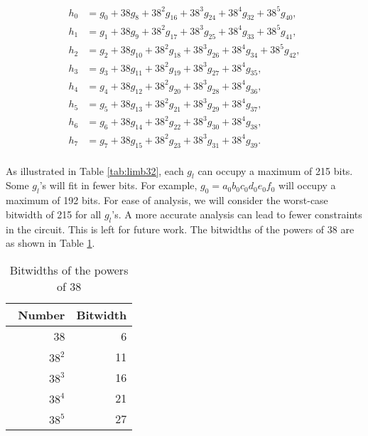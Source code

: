 \documentclass[a4paper, 12pt]{article}
\begin{document}
\begin{align*}
  h_0 & = g_0 + 38 g_8 + 38^2 g_{16} + 38^3 g_{24} + 38^4 g_{32} + 38^5 g_{40},\\
  h_1 & = g_1 + 38 g_9 + 38^2 g_{17} + 38^3 g_{25} + 38^4 g_{33} + 38^5 g_{41},\\
  h_2 & = g_2 + 38 g_{10} + 38^2 g_{18} + 38^3 g_{26} + 38^4 g_{34} + 38^5 g_{42},\\
  h_3 & = g_3 + 38 g_{11} + 38^2 g_{19} + 38^3 g_{27} + 38^4 g_{35} ,\\
  h_4 & = g_4 + 38 g_{12} + 38^2 g_{20} + 38^3 g_{28} + 38^4 g_{36},\\
  h_5 & = g_5 + 38 g_{13} + 38^2 g_{21} + 38^3 g_{29} + 38^4 g_{37},\\
  h_6 & = g_6 + 38 g_{14} + 38^2 g_{22} + 38^3 g_{30} + 38^4 g_{38},\\
  h_7 & = g_7 + 38 g_{15} + 38^2 g_{23} + 38^3 g_{31} + 38^4 g_{39}.\\
\end{align*}

As illustrated in Table \ref{tab:limb32}, each $g_l$ can occupy a maximum of 215 bits. Some $g_l$'s will fit in fewer bits. For example, $g_0 = a_0b_0c_0d_0e_0f_0$ will occupy a maximum of 192 bits. For ease of analysis, we will consider the worst-case bitwidth of 215 for all $g_l$'s. A more accurate analysis can lead to fewer constraints in the circuit. This is left for future work. The bitwidths of the powers of 38 are as shown in Table \ref{tab:powers_of_38}.
\begin{table}[h]
  \centering
  \begin{tabular}{r|r} \
    Number & Bitwidth \\ \hline
  38 & 6 \\
  $38^2$ & 11 \\
  $38^3$ & 16 \\
  $38^4$ & 21 \\
  $38^5$ & 27 \\ \hline
  \end{tabular}
  \caption{Bitwidths of the powers of 38}
  \label{tab:powers_of_38}
\end{table}
\end{document}
